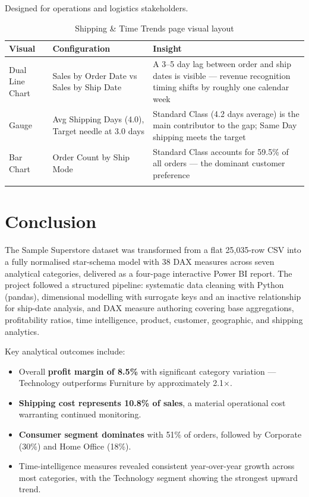 \documentclass[11pt,a4paper]{article}
\begin{document}
Designed for operations and logistics stakeholders.

\begin{longtable}{p{3cm} p{5.5cm} p{5.5cm}}
\toprule
\textbf{Visual} & \textbf{Configuration} & \textbf{Insight} \\
\midrule
\endhead
Dual Line Chart & Sales by Order Date vs Sales by Ship Date & A 3--5 day lag between order and ship dates is visible --- revenue recognition timing shifts by roughly one calendar week \\
Gauge & Avg Shipping Days (4.0), Target needle at 3.0 days & Standard Class (4.2 days average) is the main contributor to the gap; Same Day shipping meets the target \\
Bar Chart & Order Count by Ship Mode & Standard Class accounts for 59.5\% of all orders --- the dominant customer preference \\
\bottomrule
\caption{Shipping \& Time Trends page visual layout}
\end{longtable}

\newpage

\section{Conclusion}

The Sample Superstore dataset was transformed from a flat 25,035-row CSV into a fully normalised star-schema model with 38 DAX measures across seven analytical categories, delivered as a four-page interactive Power BI report. The project followed a structured pipeline: systematic data cleaning with Python (pandas), dimensional modelling with surrogate keys and an inactive relationship for ship-date analysis, and DAX measure authoring covering base aggregations, profitability ratios, time intelligence, product, customer, geographic, and shipping analytics.

Key analytical outcomes include:
\begin{itemize}
    \item Overall \textbf{profit margin of 8.5\%} with significant category variation --- Technology outperforms Furniture by approximately 2.1$\times$.
    \item \textbf{Shipping cost represents 10.8\% of sales}, a material operational cost warranting continued monitoring.
    \item \textbf{Consumer segment dominates} with 51\% of orders, followed by Corporate (30\%) and Home Office (18\%).
    \item Time-intelligence measures revealed consistent year-over-year growth across most categories, with the Technology segment showing the strongest upward trend.
\end{itemize}
\end{document}
